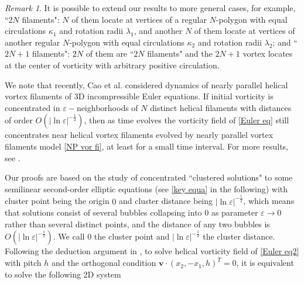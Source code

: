 \documentclass[12pt,reqno]{amsart}
\numberwithin{equation}{section}
\theoremstyle{definition}
\theoremstyle{remark}
\newtheorem{remark}[theorem]{Remark}
\begin{document}
\begin{remark}
It is possible to extend our results to more general cases, for example, ``$ 2N $ filaments": $ N $ of them locate at vertices of a regular $ N $-polygon with equal circulations $ \kappa_1 $ and rotation radii $ \lambda_1 $, and another $ N $ of them locate at vertices of another regular $ N $-polygon with  equal circulations $ \kappa_2 $ and rotation radii $ \lambda_2 $; and  ``$ 2N+1 $ filaments": $ 2N $ of them are ``$ 2N $ filaments" and the $ 2N+1 $ vortex locates at the center of vorticity with arbitrary positive circulation.

We note that recently, Cao et al. \cite{CFQW2} considered dynamics of nearly parallel helical vortex filaments of 3D incompressible Euler equations. If initial vorticity is
 concentrated in $ \varepsilon- $neighborhoods of $ N $ distinct helical filaments  with 
distances of order $ O(|\ln\varepsilon|^{-\frac{1}{2}}) $, then as time evolves the vorticity field of \eqref{Euler eq} still concentrates near helical vortex filaments evolved by  nearly parallel  vortex filaments model \ref{NP vor fi}, at least for a small time interval. For more results, see \cite{CFQW1}. 


\end{remark}

Our proofs are based on the study of concentrated ``clustered solutions" to some semilinear second-order elliptic equations (see \eqref{key equa} in the following) with cluster point being the origin $ 0 $ and cluster distance being $ |\ln\varepsilon|^{-\frac{1}{2}} $, which means that solutions consist of several bubbles collapsing into $ 0 $ as parameter $ \varepsilon\to0 $  rather than several distinct points, and the distance of any two bubbles is $ O\left ( |\ln\varepsilon|^{-\frac{1}{2}}\right ) $. We call $ 0 $ the cluster point and  $ |\ln\varepsilon|^{-\frac{1}{2}} $  the cluster distance. Following the deduction argument in \cite{CW,CW1,DDMW2, ET,GM}, to solve helical vorticity field of \eqref{Euler eq2} with pitch $ h $ and the orthogonal condition $ \textbf{v}\cdot (x_2,-x_1,h)^T=0 $, it is equivalent to solve the following 2D system
\end{document}
